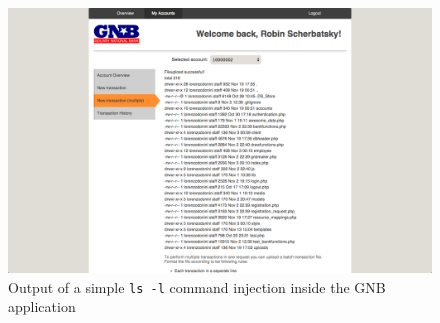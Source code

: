 \begin{figure}
	\centering
	\includegraphics[width=\textwidth]{figures/GNB_Command_Injection.png}
	\caption{Output of a simple \texttt{ls -l} command injection inside the GNB application}
\end{figure}

